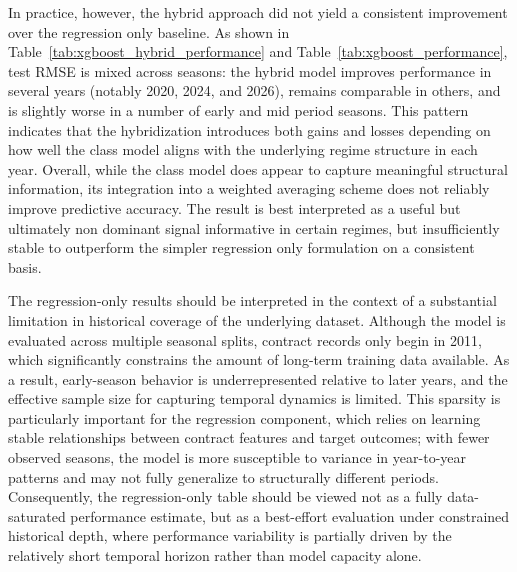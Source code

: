 \documentclass[conference]{IEEEtran}
\begin{document}
In practice, however, the hybrid approach did not yield a consistent improvement over the regression only baseline. As shown in Table~\ref{tab:xgboost_hybrid_performance} and Table~\ref{tab:xgboost_performance}, test RMSE is mixed across seasons: the hybrid model improves performance in several years (notably 2020, 2024, and 2026), remains comparable in others, and is slightly worse in a number of early and mid period seasons. This pattern indicates that the hybridization introduces both gains and losses depending on how well the class model aligns with the underlying regime structure in each year. Overall, while the class model does appear to capture meaningful structural information, its integration into a weighted averaging scheme does not reliably improve predictive accuracy. The result is best interpreted as a useful but ultimately non dominant signal informative in certain regimes, but insufficiently stable to outperform the simpler regression only formulation on a consistent basis.

\begin{table}[h]
    \centering
    
    \caption{XGBoost Hybrid Model Performance Across Evaluation Seasons}
    \label{tab:xgboost_hybrid_performance}
\end{table}

\begin{table}[h]
    \centering
    
    \caption{XGBoost Regression Only Model Performance Across Evaluation Seasons}
    \label{tab:xgboost_performance}
\end{table}

The regression-only results should be interpreted in the context of a substantial limitation in historical coverage of the underlying dataset. Although the model is evaluated across multiple seasonal splits, contract records only begin in 2011, which significantly constrains the amount of long-term training data available. As a result, early-season behavior is underrepresented relative to later years, and the effective sample size for capturing temporal dynamics is limited. This sparsity is particularly important for the regression component, which relies on learning stable relationships between contract features and target outcomes; with fewer observed seasons, the model is more susceptible to variance in year-to-year patterns and may not fully generalize to structurally different periods. Consequently, the regression-only table should be viewed not as a fully data-saturated performance estimate, but as a best-effort evaluation under constrained historical depth, where performance variability is partially driven by the relatively short temporal horizon rather than model capacity alone.
\end{document}
